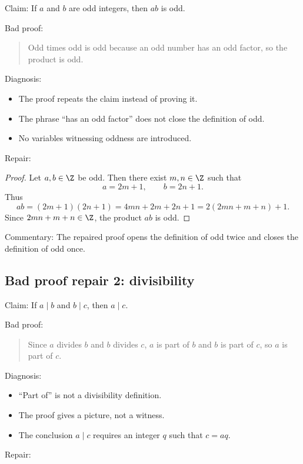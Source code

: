Claim: If $a$ and $b$ are odd integers, then $ab$ is odd.

Bad proof:

\begin{quote}
Odd times odd is odd because an odd number has an odd factor, so the product is odd.
\end{quote}

Diagnosis:

\begin{itemize}
\item The proof repeats the claim instead of proving it.
\item The phrase ``has an odd factor'' does not close the definition of odd.
\item No variables witnessing oddness are introduced.
\end{itemize}

Repair:

\begin{proof}
Let $a,b\in\Z$ be odd. Then there exist $m,n\in\Z$ such that
\[
a=2m+1,\qquad b=2n+1.
\]
Thus
\[
ab=(2m+1)(2n+1)=4mn+2m+2n+1=2(2mn+m+n)+1.
\]
Since $2mn+m+n\in\Z$, the product $ab$ is odd.
\end{proof}

Commentary: The repaired proof opens the definition of odd twice and closes the definition of odd once.

\subsection{Bad proof repair 2: divisibility}

Claim: If $a\mid b$ and $b\mid c$, then $a\mid c$.

Bad proof:

\begin{quote}
Since $a$ divides $b$ and $b$ divides $c$, $a$ is part of $b$ and $b$ is part of $c$, so $a$ is part of $c$.
\end{quote}

Diagnosis:

\begin{itemize}
\item ``Part of'' is not a divisibility definition.
\item The proof gives a picture, not a witness.
\item The conclusion $a\mid c$ requires an integer $q$ such that $c=aq$.
\end{itemize}

Repair:

